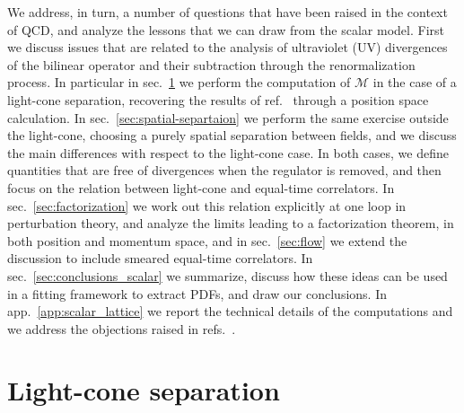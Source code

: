 We address, in turn, a number of questions that have been raised in the context of
QCD, and analyze the lessons that we can draw from the scalar model. 
First we discuss issues that are related to the analysis of ultraviolet (UV)
divergences of the bilinear operator and their subtraction through the
renormalization process. In particular in sec.~\ref{sec:light-cone} we perform
the computation of $\mathcal{M}$ in the case of a light-cone separation,
recovering the results of ref.~\cite{Collins:1980ui} through a position space
calculation. In sec.~\ref{sec:spatial-separtaion} we perform the same exercise
outside the light-cone, choosing a purely spatial separation between fields, and
we discuss the main differences with respect to the light-cone case.
In both cases, we define quantities that are free of divergences when the
regulator is removed, and then focus on the relation between light-cone and
equal-time correlators. In sec.~\ref{sec:factorization} we work out this
relation explicitly at one loop in perturbation theory, and analyze the limits
leading to a factorization theorem, in both position and momentum space, and
in sec.~\ref{sec:flow} we extend the discussion to include smeared equal-time correlators.  
In sec.~\ref{sec:conclusions_scalar} we summarize, discuss how these ideas can be used
in a fitting framework to extract PDFs, and draw our conclusions. In app.~\ref{app:scalar_lattice}
we report the technical details of the
computations and we address the objections raised in
refs.~\cite{Rossi:2017muf,Rossi:2018zkn}.


\section{Light-cone separation}
\label{sec:light-cone}

